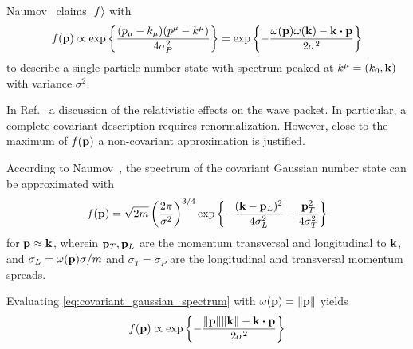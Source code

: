\begin{example}
	Naumov~\cite{Naumov2013,Naumov2009} claims $\ket{f}$ with
	\begin{equation}
		f(\vb{p})
		\propto
		\exp\left\{
			\frac{(p_\mu-k_\mu)(p^\mu-k^\mu)}{4\sigma_P^2}
		\right\}
		=
		\exp\left\{
			-
			\frac{\omega(\vb{p})\omega(\vb{k})-\vb{k}\vdot\vb{p}}{2\sigma^2}
		\right\}
		\label{eq:covariant_gaussian_spectrum}
	\end{equation}
	to describe a single-particle number state with spectrum peaked at $k^\mu=(k_0,\vb{k})$ with variance $\sigma^2$.
\end{example}
\begin{remark}
	In Ref.~\cite{Naumov2009} a discussion of the relativistic effects on the wave packet.
	In particular, a complete covariant description requires renormalization.
	However, close to the maximum of $f(\vb{p})$ a non-covariant approximation is justified.
\end{remark}
\begin{example}
	According to Naumov~\cite{Naumov2013}, the spectrum of the covariant Gaussian number state can be approximated with
	\begin{equation}
		f(\vb{p})
		=
		\sqrt{2m}
		\left(
			\frac{2\pi}{\sigma^2}
		\right)^{3/4}
		\exp\left\{
			-
			\frac{(\vb{k}-\vb{p}_L)^2}{4\sigma_L^2}
			-
			\frac{\vb{p}_T^2}{4\sigma_T^2}
		\right\}
	\end{equation}
	for $\vb{p}\approx\vb{k}$, wherein $\vb{p}_T,\vb{p}_L$ are the momentum transversal and longitudinal to $\vb{k}$, and $\sigma_L=\omega(\vb{p})\sigma/m$ and $\sigma_T=\sigma_P$ are the longitudinal and transversal momentum spreads.
\end{example}
\begin{example}
	Evaluating \cref{eq:covariant_gaussian_spectrum} with $\omega(\vb{p})=\norm{\vb{p}}$ yields
	\begin{equation}
		f(\vb{p})
		\propto
		\exp\left\{
			-
			\frac{\norm{\vb{p}}\norm{\vb{k}}-\vb{k}\vdot\vb{p}}{2\sigma^2}
		\right\}
	\end{equation}
\end{example}

